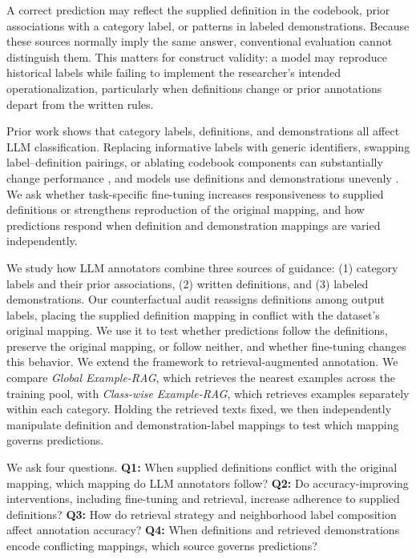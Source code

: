 \documentclass[11pt]{article}
\begin{document}
A correct prediction may reflect the supplied definition in the codebook, prior associations with a category label, or patterns in labeled demonstrations. Because these sources normally imply the same answer, conventional evaluation cannot distinguish them. This matters for construct validity: a model may reproduce historical labels while failing to implement the researcher’s intended operationalization, particularly when definitions change or prior annotations depart from the written rules. 

Prior work shows that category labels, definitions, and demonstrations all affect LLM classification. Replacing informative labels with generic identifiers, swapping label--definition pairings, or ablating codebook components can substantially change performance \citep{halterman2026codebook}, and models use definitions and demonstrations unevenly \citep{milios2023,mohammadi2025llms}. We ask whether task-specific fine-tuning increases responsiveness to supplied definitions or strengthens reproduction of the original mapping, and how predictions respond when definition and demonstration mappings are varied independently.

We study how LLM annotators combine three sources of guidance: (1) category labels and their prior associations, (2) written definitions, and (3) labeled demonstrations. Our counterfactual audit reassigns definitions among output labels, placing the supplied definition mapping in conflict with the dataset's original mapping. We use it to test whether predictions follow the definitions, preserve the original mapping, or follow neither, and whether fine-tuning changes this behavior. We extend the framework to retrieval-augmented annotation. We compare \emph{Global Example-RAG}, which retrieves the nearest examples across the training pool, with \emph{Class-wise Example-RAG}, which retrieves examples separately within each category. Holding the retrieved texts fixed, we then independently manipulate definition and demonstration-label mappings to test which mapping governs predictions.

We ask four questions. \textbf{Q1:} When supplied definitions conflict with the original mapping, which mapping do LLM annotators follow? \textbf{Q2:} Do accuracy-improving interventions, including fine-tuning and retrieval, increase adherence to supplied definitions? \textbf{Q3:} How do retrieval strategy and neighborhood label composition affect annotation accuracy? \textbf{Q4:} When definitions and retrieved demonstrations encode conflicting mappings, which source governs predictions?
\end{document}
